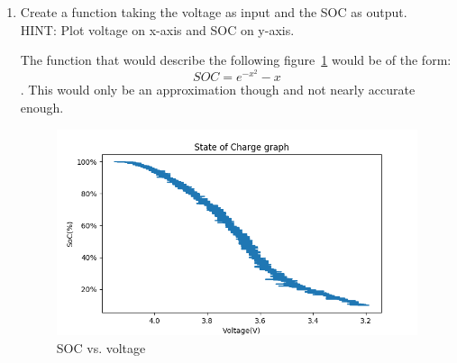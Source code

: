 \documentclass[paper=letter, fontsize=10pt]{article}
\begin{document}
\begin{enumerate}
\item Create a function taking the voltage as input and the SOC as output.\\
HINT: Plot voltage on x-axis and SOC on y-axis.

The function that would describe the following figure~\ref{fig_SOC} would be of the form:
$$ SOC = {e}^{-x^2}-x $$. 
This would only be an approximation though and not nearly accurate enough.

\begin{figure}[H]
\centering
\includegraphics[scale=0.7]{Figures/StateOfCharge}
\caption{SOC vs. voltage}
\label{fig_SOC}
\end{figure}

\end{enumerate}

\pagebreak



\end{document}
